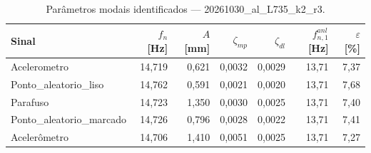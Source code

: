 \begin{table}[htbp]
  \centering
  \caption{Parâmetros modais identificados — 20261030\_al\_L735\_k2\_r3.}
  \label{tab:modal_20261030_al_L735_k2_r3}
  \begin{tabular}{lrrrrrr}
    \toprule
    Sinal & $f_n$ [Hz] & $A$ [mm] & $\zeta_{mp}$ & $\zeta_{dl}$ & $f_{n,1}^{anl}$ [Hz] & $\varepsilon$ [\%] \\
    \midrule
    Acelerometro & 14{,}719 & 0{,}621 & 0{,}0032 & 0{,}0029 & 13{,}71 & 7{,}37 \\
    Ponto\_aleatorio\_liso & 14{,}762 & 0{,}591 & 0{,}0021 & 0{,}0020 & 13{,}71 & 7{,}68 \\
    Parafuso & 14{,}723 & 1{,}350 & 0{,}0030 & 0{,}0025 & 13{,}71 & 7{,}40 \\
    Ponto\_aleatorio\_marcado & 14{,}726 & 0{,}796 & 0{,}0028 & 0{,}0022 & 13{,}71 & 7{,}41 \\
    Acelerômetro & 14{,}706 & 1{,}410 & 0{,}0051 & 0{,}0025 & 13{,}71 & 7{,}27 \\
    \bottomrule
  \end{tabular}
\end{table}
